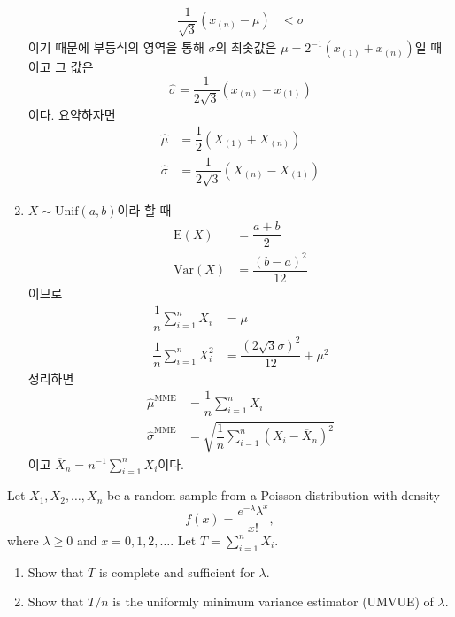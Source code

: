 \documentclass[answers]{exam}
\begin{document}
\begin{questions}
\begin{solution}
\begin{enumerate}
\begin{align}
        \dfrac{1}{\sqrt{3}}\left(x_{\left(n\right)}-\mu\right)&<\sigma
      \end{align}
      이기 때문에 부등식의 영역을 통해 $\sigma$의 최솟값은 $\mu=2^{-1}\left(x_{\left(1\right)}+x_{\left(n\right)}\right)$일 때이고 그 값은
      \begin{equation}
        \widehat{\sigma} = \dfrac{1}{2\sqrt{3}}\left(x_{\left(n\right)}-x_{\left(1\right)}\right)
      \end{equation}
      이다. 요약하자면
      \begin{align}
        \widehat{\mu} &= \dfrac{1}{2}\left(X_{\left(1\right)}+X_{\left(n\right)}\right)\\
        \widehat{\sigma} &= \dfrac{1}{2\sqrt{3}}\left(X_{\left(n\right)}-X_{\left(1\right)}\right)
      \end{align}
      \item $X\sim \mathrm{Unif}\left(a,b\right)$이라 할 때
      \begin{align}
        \mathrm{E}\left(X\right) &= \dfrac{a+b}{2}\\
        \mathrm{Var}\left(X\right) &= \dfrac{\left(b-a\right)^{2}}{12}
      \end{align}
      이므로
      \begin{align}
        \dfrac{1}{n}\sum_{i=1}^{n}X_{i} &= \mu\\
        \dfrac{1}{n}\sum_{i=1}^{n}X_{i}^{2} &= \dfrac{\left(2\sqrt{3}\sigma\right)^{2}}{12}+\mu^{2}
      \end{align}
      정리하면
      \begin{align}
        \widehat{\mu}^{\text{MME}} &= \dfrac{1}{n}\sum_{i=1}^{n}X_{i}\\
        \widehat{\sigma}^{\text{MME}} &= \sqrt{\dfrac{1}{n}\sum_{i=1}^{n}\left(X_{i}-\overline{X}_{n}\right)^{2}}
      \end{align}
      이고 $\overline{X}_{n}=n^{-1}\sum_{i=1}^{n}X_{i}$이다.
    \end{enumerate}
   \end{solution}
   \question
   Let $X_{1},X_{2},\ldots,X_{n}$ be a random sample from a Poisson distribution with density
   $$
    f\left(x\right)=\dfrac{e^{-\lambda}\lambda^{x}}{x!},
   $$
   where $\lambda \geq 0$ and $x=0,1,2,\ldots$. Let $T=\displaystyle \sum_{i=1}^{n}X_{i}$.
   \begin{enumerate}
    \item Show that $T$ is complete and sufficient for $\lambda$.
    \item Show that $T/n$ is the uniformly minimum variance estimator (UMVUE) of $\lambda$.

\end{enumerate}
\end{questions}
\end{document}
